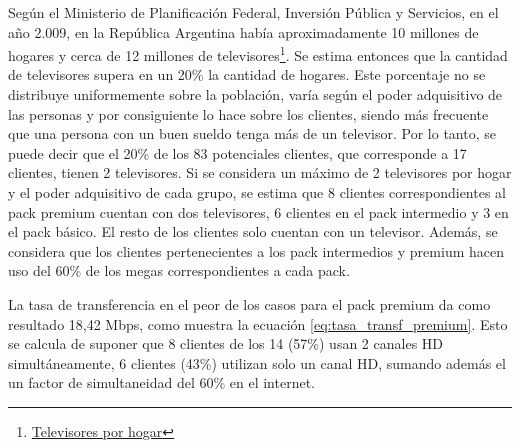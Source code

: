 \documentclass[11pt,a4paper]{article}
\begin{document}
\begin{table}[htbp]
\caption{contenido de pack de servicios.}
\label{tab:cont_pack_servicio}
\end{table}
 



 Según el Ministerio de Planificación Federal, Inversión Pública y Servicios, en el año 2.009, en la República Argentina había aproximadamente 10 millones de hogares y cerca de 12 millones de televisores\footnote{\href{http://www.infoleg.gob.ar/basehome/actos_gobierno/actosdegobierno14-9-2009-2.htm}{Televisores por hogar}}. 
 Se estima entonces que la cantidad de televisores supera en un 20\% la cantidad de hogares. 
 Este porcentaje no se distribuye uniformemente sobre la población, varía según el poder adquisitivo de las personas y por consiguiente lo hace sobre los clientes, siendo más frecuente que una persona con un buen sueldo tenga más de un televisor. 
 Por lo tanto, se puede decir que el 20\% de los 83 potenciales clientes, que corresponde a 17 clientes, tienen 2 televisores.
Si se considera un máximo de 2 televisores por hogar y el poder adquisitivo de cada grupo, se estima que 8 clientes correspondientes al pack premium cuentan con dos televisores, 6 clientes en el pack intermedio y 3 en el pack básico.
El resto de los clientes solo cuentan con un televisor. 
Además, se considera que los clientes pertenecientes a los pack intermedios y premium hacen uso del 60\% de los megas correspondientes a cada pack.

La tasa de transferencia en el peor de los casos para el pack premium da como resultado 18,42 Mbps, como muestra la ecuación \ref{eq:tasa_transf_premium}. 
Esto se calcula de suponer que 8 clientes de los 14 (57\%) usan 2 canales HD simultáneamente, 6 clientes (43\%) utilizan solo un canal HD, sumando además el un factor de simultaneidad del 60\% en el internet. 
\end{document}
